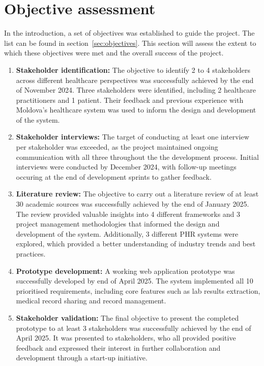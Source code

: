 \section{Objective assessment}

In the introduction, a set of objectives was established to guide the project. The list can be found in section~\ref{sec:objectives}. This section will assess the extent to which these objectives were met and the overall success of the project.

\begin{enumerate}
    \item \textbf{Stakeholder identification:} The objective to identify 2 to 4 stakeholders across different healthcare perspectives was successfully achieved by the end of November 2024. Three stakeholders were identified, including 2 healthcare practitioners and 1 patient. Their feedback and previous experience with Moldova's healthcare system was used to inform the design and development of the system. 
    \item \textbf{Stakeholder interviews:} The target of conducting at least one interview per stakeholder was exceeded, as the project maintained ongoing communication with all three throughout the the development process. Initial interviews were conducted by December 2024, with follow-up meetings occuring at the end of development sprints to gather feedback. 
    \item \textbf{Literature review:} The objective to carry out a literature review of at least 30 academic sources was successfully achieved by the end of January 2025. The review provided valuable insights into 4 different frameworks and 3 project management methodologies that informed the design and development of the system. Additionally, 3 different PHR systems were explored, which provided a better understanding of industry trends and best practices.  
    \item \textbf{Prototype development:} A working web application prototype was successfully developed by end of April 2025. The system implemented all 10 prioritised requirements, including core features such as lab results extraction, medical record sharing and record management.
    \item \textbf{Stakeholder validation:} The final objective to present the completed prototype to at least 3 stakeholders was successfully achieved by the end of April 2025. It was presented to stakeholders, who all provided positive feedback and expressed their interest in further collaboration and development through a start-up initiative.
\end{enumerate}

